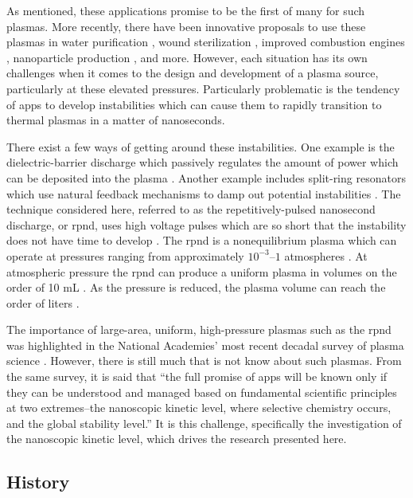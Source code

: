 As mentioned, these applications promise to be the first of many for such
plasmas. More recently, there have been innovative proposals to use these
plasmas in water purification \cite{Malik2001}, wound sterilization
\cite{Ayan2009}, improved combustion engines \cite{Nishihara2007}, nanoparticle
production \cite{Ostrikov2011}, and more. However, each situation has its own
challenges when it comes to the design and development of a plasma source,
particularly at these elevated pressures. Particularly problematic is the
tendency of \acs{app}s to develop instabilities which can cause them to rapidly
transition to thermal plasmas in a matter of nanoseconds.

There exist a few ways of getting around these instabilities. One example is the
dielectric-barrier discharge which passively regulates the amount of power which
can be deposited into the plasma \cite{Kogelschatz2003}. Another example
includes split-ring resonators which use natural feedback mechanisms to damp out
potential instabilities \cite{Iza2005}. The technique considered here, referred
to as the repetitively-pulsed nanosecond discharge, or \acs{rpnd}, uses high
voltage pulses which are so short that the instability does not have time to
develop \cite{Adamovich2008}. The \acs{rpnd} is a nonequilibrium plasma which
can operate at pressures ranging from approximately $10^{-3}$--$1$ atmospheres
\cite{Vasilyak1994}. At atmospheric pressure the \acs{rpnd} can produce a
uniform plasma in volumes on the order of 10 mL \cite{Walsh2006}. As the
pressure is reduced, the plasma volume can reach the order of liters
\cite{Starikovskaia1998}.

The importance of large-area, uniform, high-pressure plasmas such as the
\acs{rpnd} was highlighted in the National Academies' most recent decadal survey
of plasma science \cite{NA2007}. However, there is still much that is not know
about such plasmas. From the same survey, it is said that ``the full promise of
\acs{app}s will be known only if they can be understood and managed based on
fundamental scientific principles at two extremes--the nanoscopic kinetic level,
where selective chemistry occurs, and the global stability level.'' It is this
challenge, specifically the investigation of the nanoscopic kinetic level, which
drives the research presented here.

\subsection{History}


